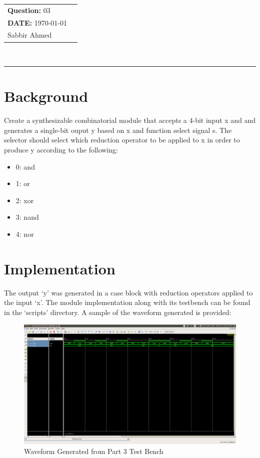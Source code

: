\documentclass[paper=usletter, fontsize=12pt]{article}
\newcommand{\documentinfo}[3]{
    \begin{centering}
        \parbox{2in}{
        \begin{spacing}{1}
            \begin{flushleft}
                \begin{tabular}{l l}
                    #1 \\
                    #2 \\
                    #3 \\
                \end{tabular}\\
                \rule{\textwidth}{1pt}
            \end{flushleft}
        \end{spacing}
        }
    \end{centering}
}
\begin{document}
    \documentinfo{\textbf{Question:} 03}{\textbf{DATE:} \today}{Sabbir Ahmed}
    \vspace{-0.1in}

    \section{Background}
    Create a synthesizable combinatorial module that accepts a 4-bit input x and and generates a single-bit ouput y based on x and function select signal s. The selector should select which reduction operator to be applied to x in order to produce y according to the following:

    \begin{itemize}
        \item 0: and
        \item 1: or
        \item 2: xor
        \item 3: nand
        \item 4: nor
    \end{itemize}

    \section{Implementation}
    The output `y' was generated in a case block with reduction operators applied to the input `x'. The module implementation along with its testbench can be found in the `scripts' directory. A sample of the waveform generated is provided:

    \begin{figure}[ht]
        \begin{center}
            \includegraphics[width=1\textwidth]{wav.png}
            \caption{Waveform Generated from Part 3 Test Bench} \label{fig:wav}
        \end{center}
    \end{figure}
\end{document}
